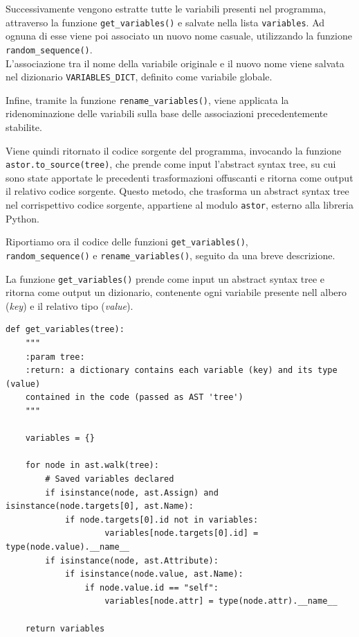 \documentclass[a4paper,oneside,openright,titlepage,10pt,footinclude,headinclude]{scrbook}
\begin{document}
Successivamente vengono estratte tutte le variabili presenti nel programma, attraverso la funzione \texttt{get\_variables()} e salvate nella lista \texttt{variables}. Ad ognuna di esse viene poi associato un nuovo nome casuale, utilizzando la funzione \texttt{random\_sequence()}.\\
L'associazione tra il nome della variabile originale e il nuovo nome viene salvata nel dizionario \texttt{VARIABLES\_DICT}, definito come variabile globale.

Infine, tramite la funzione \texttt{rename\_variables()}, viene applicata la ridenominazione delle variabili sulla base delle associazioni precedentemente stabilite.

Viene quindi ritornato il codice sorgente del programma, invocando la funzione  \texttt{astor.to\_source(tree)}, che prende come input l'abstract syntax tree, su cui sono state apportate le precedenti trasformazioni offuscanti e ritorna come output il relativo codice sorgente. Questo metodo, che trasforma un abstract syntax tree nel corrispettivo codice sorgente, appartiene al modulo \texttt{astor}, esterno alla libreria Python.\bigskip


Riportiamo ora il codice delle funzioni \texttt{get\_variables()},\\ \texttt{random\_sequence()} e \texttt{rename\_variables()}, seguito da una breve descrizione.\smallskip

La funzione \texttt{get\_variables()} prende come input un abstract syntax tree e ritorna come output un dizionario, contenente ogni variabile presente nell albero (\emph{key}) e il relativo tipo (\emph{value}).
\begin{graybox}[innerleftmargin=2,]
\begin{lstlisting}
def get_variables(tree):
    """
    :param tree:
    :return: a dictionary contains each variable (key) and its type (value) 
    contained in the code (passed as AST 'tree')
    """

    variables = {}

    for node in ast.walk(tree):
        # Saved variables declared
        if isinstance(node, ast.Assign) and isinstance(node.targets[0], ast.Name):
            if node.targets[0].id not in variables:
                    variables[node.targets[0].id] = type(node.value).__name__
        if isinstance(node, ast.Attribute):
            if isinstance(node.value, ast.Name):
                if node.value.id == "self":
                    variables[node.attr] = type(node.attr).__name__
        
    return variables
\end{lstlisting}
\end{graybox}
\end{document}
